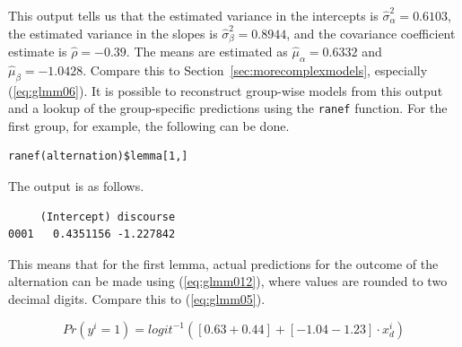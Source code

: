 \documentclass[a4paper,12pt]{article}
\begin{document}
This output tells us that the estimated variance in the intercepts is $\hat{\sigma}_{\alpha}^2=0.6103$, the estimated variance in the slopes is $\hat{\sigma}_{\beta}^2=0.8944$, and the covariance coefficient estimate is $\hat{\rho}=-0.39$.
The means are estimated as $\hat{\mu}_{\alpha}=0.6332$ and $\hat{\mu}_{\beta}=-1.0428$.
Compare this to Section~\ref{sec:morecomplexmodels}, especially (\ref{eq:glmm06}).
It is possible to reconstruct group-wise models from this output and a lookup of the group-specific predictions using the \texttt{ranef} function.
For the first group, for example, the following can be done.

\vspace{0.5\baselineskip}

\begin{lstlisting}
ranef(alternation)$lemma[1,]
\end{lstlisting}

The output is as follows.

\vspace{0.5\baselineskip}

\begin{lstlisting}
     (Intercept) discourse
0001   0.4351156 -1.227842
\end{lstlisting}

This means that for the first lemma, actual predictions for the outcome of the alternation can be made using (\ref{eq:glmm012}), where values are rounded to two decimal digits.
Compare this to (\ref{eq:glmm05}).

\begin{equation}
  Pr(y^i=1)=logit^{-1}( [0.63+0.44] + [-1.04-1.23]\cdot x_d^i )
  \label{eq:glmm012}
\end{equation}

% 
\end{document}
